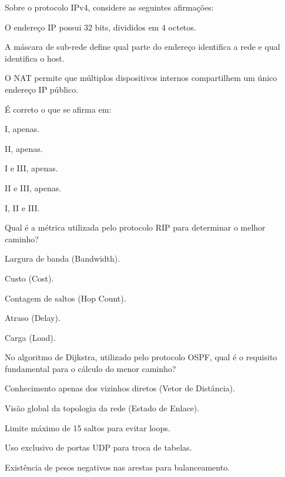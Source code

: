 \documentclass[11pt, addpoints]{modelo/prova2}
\begin{document}
\maketitle 

\question[0.5] Sobre o protocolo IPv4, considere as seguintes afirmações:
    \begin{statements}
        \item O endereço IP possui 32 bits, divididos em 4 octetos.
        \item A máscara de sub-rede define qual parte do endereço identifica a rede e qual identifica o host.
        \item O NAT permite que múltiplos dispositivos internos compartilhem um único endereço IP público.
    \end{statements}
    É correto o que se afirma em:
    \begin{choices}
        \item I, apenas.
        \item II, apenas.
        \item I e III, apenas.
        \item II e III, apenas.
        \item I, II e III.
    \end{choices} 
\question[0.5] Qual é a métrica utilizada pelo protocolo RIP para determinar o melhor caminho?    
    \begin{choices}
        \item Largura de banda (Bandwidth).        
        \item Custo (Cost).
        \item Contagem de saltos (Hop Count).
        \item Atraso (Delay).
        \item Carga (Load).
    \end{choices} 
\question[0.5] No algoritmo de Dijkstra, utilizado pelo protocolo OSPF, qual é o requisito fundamental para o cálculo do menor caminho?
    \begin{choices}
        \item Conhecimento apenas dos vizinhos diretos (Vetor de Distância).
        \item Visão global da topologia da rede (Estado de Enlace).
        \item Limite máximo de 15 saltos para evitar loops.
        \item Uso exclusivo de portas UDP para troca de tabelas.
        \item Existência de pesos negativos nas arestas para balanceamento.
    \end{choices} 
\end{document}
